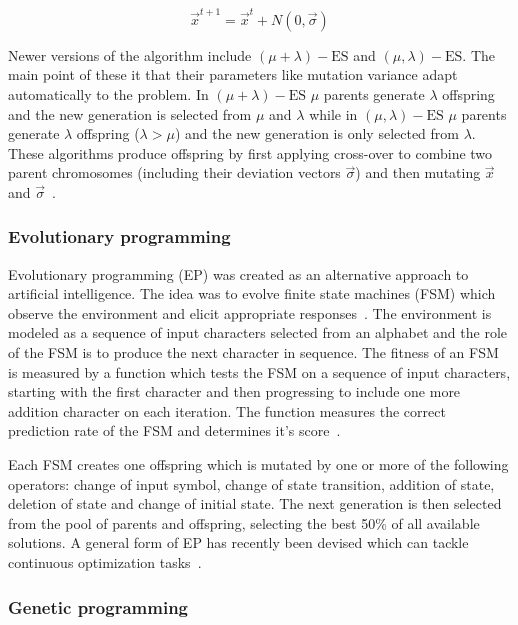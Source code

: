 \begin{equation}
  \vec{x}^{t+1} =  \vec{x}^{t} + N(0,\vec{\sigma})
  \label{eq:evolutionstrategy1}
\end{equation}

Newer versions of the algorithm include $(\mu + \lambda)-\text{ES}$ and $(\mu,\lambda)-\text{ES}$. The main point of these it that their parameters like mutation variance adapt automatically to the problem. In $(\mu + \lambda)-\text{ES}$ $\mu$ parents generate $\lambda$ offspring and the new generation is selected from $\mu$ and $\lambda$ while in $(\mu,\lambda)-\text{ES}$ $\mu$ parents generate $\lambda$ offspring ($\lambda > \mu$) and the new generation is only selected from $\lambda$. These algorithms produce offspring by first applying cross-over to combine two parent chromosomes (including their deviation vectors $\vec{\sigma}$) and then mutating $\vec{x}$ and $\vec{\sigma}$~\cite{Michalewicz1997}.

\subsubsection{Evolutionary programming}

Evolutionary programming (EP) was created as an alternative approach to artificial intelligence. The idea was to evolve finite state machines (FSM) which observe the environment and elicit appropriate responses~\cite{Fogel1996}. The environment is modeled as a sequence of input characters selected from an alphabet and the role of the FSM is to produce the next character in sequence. The fitness of an FSM is measured by a function which tests the FSM on a sequence of input characters, starting with the first character and then progressing to include one more addition character on each iteration. The function measures the correct prediction rate of the FSM and determines it's score~\cite{Michalewicz1997}.

Each FSM creates one offspring which is mutated by one or more of the following operators: change of input symbol, change of state transition, addition of state, deletion of state and change of initial state. The next generation is then selected from the pool of parents and offspring, selecting the best 50\% of all available solutions. A general form of EP has recently been devised which can tackle continuous optimization tasks~\cite{Michalewicz1997}.

\subsubsection{Genetic programming}

